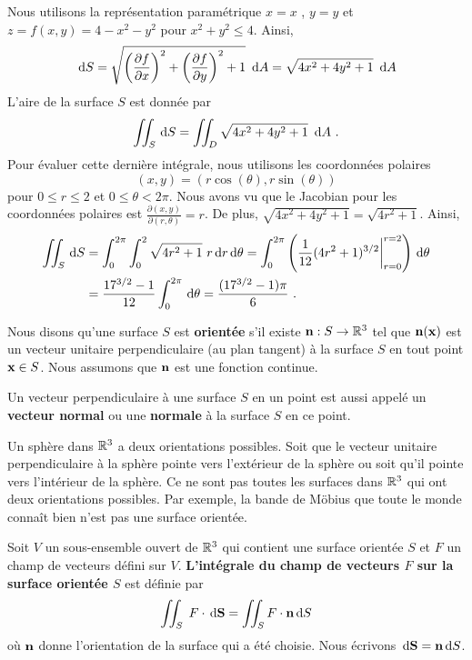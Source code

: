 {\begin{egg}
Nous utilisons la représentation paramétrique $x = x$ , $y = y$ et
$z = f(x,y) = 4 - x^2 - y^2$ pour $x^2 + y^2 \leq 4$.   Ainsi,
\[
\,\mathrm{d}S = \sqrt{ \left(\frac{\partial f}{\partial x}\right)^2 +
  \left(\frac{\partial f}{\partial y}\right)^2 + 1}\ \,\mathrm{d}A
  = \sqrt{ 4x^2 + 4y^2 + 1}\ \,\mathrm{d}A
\]
L'aire de la surface $S$ est donnée par
\[
  \iint_S \,\mathrm{d}S = \iint_D \sqrt{ 4x^2 + 4y^2 + 1}\ \,\mathrm{d}A \ .
\]
Pour évaluer cette dernière intégrale, nous utilisons les coordonnées
polaires
\[
  (x,y) = (r \cos(\theta), r \sin(\theta))
\]
pour $0 \leq r \leq 2$ et $0 \leq \theta < 2\pi$.   Nous avons vu que
le Jacobian pour les coordonnées polaires est
$\displaystyle \frac{\partial(x,y)}{\partial(r,\theta)} = r $.  De
plus, $\sqrt{ 4x^2 + 4y^2 + 1} = \sqrt{4r^2 +1}$.  Ainsi,
\begin{align*}
\iint_S \,\mathrm{d}S &= \int_0^{2\pi} \int_0^2 \sqrt{ 4r^2 + 1}\ r \,\mathrm{d}r
 \,\mathrm{d}\theta
= \int_0^{2\pi} \left(\frac{1}{12} (4r^2 + 1)^{3/2}\bigg|_{r=0}^{r=2} \right)  
 \,\mathrm{d}\theta \\
&= \frac{17^{3/2} -1}{12} \int_0^{2\pi} \,\mathrm{d}\theta
= \frac{(17^{3/2} -1)\pi}{6} \ .
\end{align*}
\end{egg}

\begin{focus}{\dfn} 
Nous disons qu'une surface $S$ est {\bfseries orientée} s'il existe
$\mathbf{n}:S\rightarrow \mathbb{R}^3$ tel que $\mathbf{n}(\mathbf{x})$ est un
vecteur unitaire perpendiculaire (au plan tangent) à la surface
$S$ en tout point $\mathbf{x} \in S$.  Nous assumons que
$\mathbf{n}$ est une fonction continue.
\end{focus}

\begin{focus}{\dfn}
Un vecteur perpendiculaire à une surface $S$ en un point est aussi
appelé un {\bfseries vecteur normal} ou une
{\bfseries normale} à la surface $S$ en ce point. 
\end{focus}

Un sphère dans $\mathbb{R}^3$ a deux orientations possibles.  Soit que le
vecteur unitaire perpendiculaire à la sphère pointe vers l'extérieur
de la sphère ou soit qu'il pointe vers l'intérieur de la sphère.
Ce ne sont pas toutes les surfaces dans $\mathbb{R}^3$ qui ont deux
orientations possibles.  Par exemple, la bande de Möbius que toute le
monde connaît bien n'est pas une surface orientée.

\begin{focus}{\dfn}
Soit $V$ un sous-ensemble ouvert de $\mathbb{R}^3$ qui contient une surface
orientée $S$ et $F$ un champ de vecteurs défini sur $V$.
{\bfseries L'intégrale du champ de vecteurs $F$ sur la surface
orientée $S$} est définie par
\[
\iint_S\; F \cdot \,\mathrm{d}\mathbf{S} = \iint_S F \cdot \mathbf{n} \,\mathrm{d}S
\]
où $\mathbf{n}$ donne l'orientation de la surface qui a été choisie.
Nous écrivons $\,\mathrm{d}\mathbf{S} = \mathbf{n} \,\mathrm{d}S$.
\end{focus}

}
